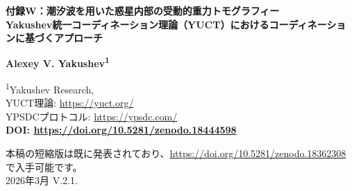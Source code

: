 \documentclass[12pt,a4paper]{article}
\theoremstyle{remark}
\begin{document}
	
	\begin{titlepage}
		\begin{center}
			\vspace*{1cm}
			
			{\Huge\textbf{付録W：潮汐波を用いた惑星内部の受動的重力トモグラフィー}} \\
			\vspace{0.5cm}
			{\Large\textbf{Yakushev統一コーディネーション理論（YUCT）におけるコーディネーションに基づくアプローチ}}
			
			\vspace{1.5cm}
			
			{\Large\textbf{Alexey V. Yakushev\textsuperscript{1}}}
			
			\vspace{0.3cm}
			\large
			\textsuperscript{1}Yakushev Research, \\
			YUCT理論: \url{https://yuct.org/}\\
			YPSDCプロトコル: \url{https://ypsdc.com/}\\
			
			
			\vspace{2cm}
			\textbf{DOI: \url{https://doi.org/10.5281/zenodo.18444598}}\\
			
			\vspace{1cm}
			
			\large 
			本稿の短縮版は既に発表されており、\url{https://doi.org/10.5281/zenodo.18362308} で入手可能です。\\
			\vspace{1cm}
			2026年3月 \quad \large V.2.1.
			
			\vspace{2cm}
			

\end{center}
\end{titlepage}
\end{document}
